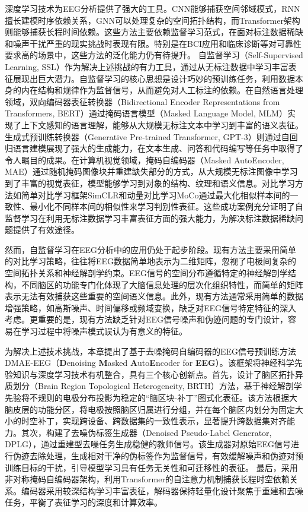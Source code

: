 深度学习技术为EEG分析提供了强大的工具。CNN能够捕获空间邻域模式\cite{lawhernEEGnet2018}，RNN擅长建模时序依赖关系，GNN可以处理复杂的空间拓扑结构\cite{pan2023st}，而Transformer架构则能够捕获长程时间依赖\cite{defossez2023decoding, songEEG2022, bagchi2022eeg}。这些方法主要依赖监督学习范式\cite{mahmood2019fully}，在面对标注数据稀缺和噪声干扰严重的现实挑战时表现有限。特别是在BCI应用\cite{chaudhary2016brain}和临床诊断等对可靠性要求高的场景中，这些方法的泛化能力仍有待提升。
自监督学习（Self-Supervised Learning, SSL）作为解决上述挑战的有力工具，通过从无标注数据中学习丰富表征展现出巨大潜力。自监督学习的核心思想是设计巧妙的预训练任务，利用数据本身的内在结构和规律作为监督信号，从而避免对人工标注的依赖。在自然语言处理领域，双向编码器表征转换器（Bidirectional Encoder Representations from Transformers, BERT）\cite{devlin_bert_2018}通过掩码语言模型（Masked Language Model, MLM）实现了上下文感知的语言理解，能够从大规模无标注文本中学习到丰富的语义表征。生成式预训练转换器（Generative Pre-trained Transformer, GPT-3）\cite{floridi_gpt-3_2020}则通过自回归语言建模展现了强大的生成能力，在文本生成、问答和代码编写等任务中取得了令人瞩目的成果。在计算机视觉领域，掩码自编码器（Masked AutoEncoder, MAE）\cite{he2022masked}通过随机掩码图像块并重建缺失部分的方式，从大规模无标注图像中学习到了丰富的视觉表征，模型能够学习到对象的结构、纹理和语义信息。对比学习方法如简单对比学习框架SimCLR\cite{chen2020simple}和动量对比学习MoCo\cite{he2020momentum}通过最大化相似样本间的一致性、最小化不同样本间的相似性来学习判别性表征。这些成功案例充分证明了自监督学习在利用无标注数据学习丰富表征方面的强大能力，为解决标注数据稀缺问题提供了有效途径。


然而，自监督学习在EEG分析中的应用仍处于起步阶段。现有方法主要采用简单的对比学习策略\cite{krishnan_self-supervised_2022, misra_self-supervised_2020, rafiei2022self}，往往将EEG数据简单地表示为二维矩阵，忽视了电极间复杂的空间拓扑关系和神经解剖学约束。EEG信号的空间分布遵循特定的神经解剖学结构，不同脑区的功能专门化体现了大脑信息处理的层次化组织特性，而简单的矩阵表示无法有效捕获这些重要的空间语义信息。此外，现有方法通常采用简单的数据增强策略，如高斯噪声、时间偏移或频域变换\cite{shen2022contrastive}，缺乏对EEG信号特定特征的深入考虑。更重要的是，现有方法缺乏针对EEG信号噪声和伪迹问题的专门设计，容易在学习过程中将噪声模式误认为有意义的特征。


为解决上述技术挑战，本章提出了基于去噪掩码自编码器的EEG信号预训练方法DMAE-EEG（\textbf{D}enoising \textbf{M}asked \textbf{A}uto\textbf{E}ncoder for \textbf{EEG}）。该框架将神经科学先验知识与深度学习技术有机整合，具有三个核心创新点。首先，设计了脑区拓扑异质划分（Brain Region Topological Heterogeneity, BRTH）方法，基于神经解剖学先验将不规则的电极分布投影为稳定的“脑区块-补丁”图式化表征。该方法根据大脑皮层的功能分区，将电极按照脑区归属进行分组，并在每个脑区内划分为固定大小的时空补丁，实现跨设备、跨数据集的一致性表示，显著提升跨数据集对齐能力。其次，构建了去噪伪标签生成器（Denoised Pseudo-Label Generator, DPLG），通过重建型去噪任务生成稳健的教师信号。该生成器对原始EEG信号进行伪迹去除处理，生成相对干净的伪标签作为监督信号，有效缓解噪声和伪迹对预训练目标的干扰，引导模型学习具有任务无关性和可迁移性的表征。
最后，采用非对称掩码自编码器架构，利用Transformer的自注意力机制捕获长程时空依赖关系。编码器采用较深结构学习丰富表征，解码器保持轻量化设计聚焦于重建和去噪任务，平衡了表征学习的深度和计算效率。

